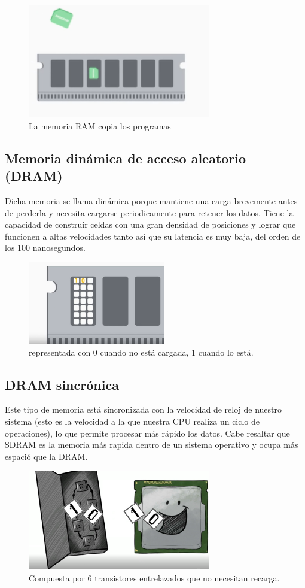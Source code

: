 \documentclass{article}
\begin{document}
\begin{figure}[h]
\includegraphics[width=8cm]{Captura.2.PNG}
\centering
\caption{La memoria RAM copia los programas\cite{Coursera}}
\label{Captura.2.PNG}
\end{figure}
\subsection{Memoria dinámica de acceso aleatorio (DRAM)}
Dicha memoria se llama dinámica porque mantiene una carga brevemente antes de perderla y necesita cargarse periodicamente para retener los datos. Tiene la capacidad de construir celdas con una gran densidad de posiciones y lograr que funcionen a altas velocidades tanto así que su latencia es muy baja, del orden de los 100 nanosegundos.

\begin{figure}[h]
\includegraphics[width=6cm]{dram.PNG}
\centering
\caption{representada con 0 cuando no está cargada, 1 cuando lo está.\cite{Coursera}}
\label{dram.PNG}
\end{figure}
\subsection{DRAM sincrónica}
Este tipo de memoria está sincronizada con la velocidad de reloj de nuestro sistema (esto es la velocidad a la que nuestra CPU realiza un ciclo de operaciones), lo que permite procesar más rápido los datos. Cabe resaltar que SDRAM es la memoria más rapida dentro de un sistema operativo y ocupa más espació que la DRAM.

\begin{figure}[h]
\includegraphics[width=8cm]{SDRAm.PNG}
\centering
\caption{Compuesta por 6 transistores entrelazados que no necesitan recarga.\cite{TEDwebsite}}
\label{SDRAm.PNG}
\end{figure}
\end{document}
